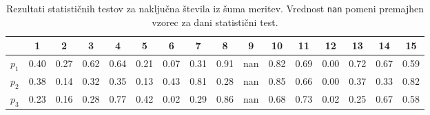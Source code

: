 \documentclass[11pt, oneside]{article}
\theoremstyle{definition}
\begin{document}
\begin{table}[h!]
    \begin{center}
        \hspace*{-0.8cm}
        \begin{tabular}{cccccccccccccccc}
            \toprule
            {}    & 1    & 2    & 3    & 4    & 5    & 6    & 7    & 8    & 9   & 10   & 11   & 12                       & 13   & 14   & 15   \\
            \midrule
            $p_1$ & 0.40 & 0.27 & 0.62 & 0.64 & 0.21 & 0.07 & 0.31 & 0.91 & nan & 0.82 & 0.69 & \cellcolor{red!40} 0.00  & 0.72 & 0.67 & 0.59 \\
            $p_2$ & 0.38 & 0.14 & 0.32 & 0.35 & 0.13 & 0.43 & 0.81 & 0.28 & nan & 0.85 & 0.66 & \cellcolor{red!40}  0.00 & 0.37 & 0.33 & 0.82 \\
            \rowcolor{green!40}
            $p_3$ & 0.23 & 0.16 & 0.28 & 0.77 & 0.42 & 0.02 & 0.29 & 0.86 & nan & 0.68 & 0.73 & 0.02                     & 0.25 & 0.67 & 0.58 \\
            \bottomrule
        \end{tabular}
    \end{center}
    \caption{Rezultati statističnih testov za naključna števila iz šuma meritev. Vrednost \texttt{nan} pomeni premajhen vzorec za dani statistični test.}
    \label{tab: 3}
\end{table}
\end{document}
